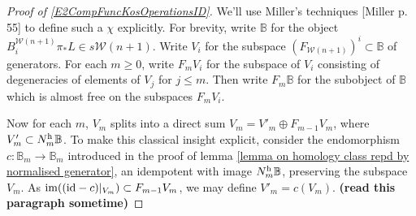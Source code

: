 \documentclass[11pt]{amsart}
\theoremstyle{plain}
\theoremstyle{definition}
\DeclareMathOperator{\im}{im}
\renewcommand{\to}{\longrightarrow}
\newcommand{\calW}{\mathcal{W}}
\theoremstyle{plain}
\newcommand{\Id}{\textup{id}}
\begin{document}
\begin{Composite functor spectral sequences}
\begin{tricky proofs of operation compatibilities}
\begin{proof}[Proof of \ref{E2CompFuncKosOperationsID}]
We'll use Miller's techniques [Miller p. 55] to define such a $\chi$ explicitly. For brevity, write $\mathbb{B}$ for the object $B_i^{\calW(n+1)}\pi_*L\in s\calW(n+1)$. Write $V_i$ for the subspace $(F_{\calW(n+1)})^{i}\subset \mathbb{B}$ of generators. For each $m\geq0$, write $F_mV_i$ for the subspace of $V_i$ consisting of degeneracies of elements of $V_j$ for $j\leq m$. Then write $F_m\mathbb{B}$ for the subobject of $\mathbb{B}$ which is almost free on the subspaces $F_mV_i$.

Now for each $m$, $V_m$ splits into a direct sum
$V_m=V'_m\oplus F_{m-1}V_m$,
where $V'_m\subset N_m^\textup{h}\mathbb{B}$. To make this classical insight explicit, consider the endomorphism $c:\mathbb{B}_m\to \mathbb{B}_m$ introduced in the proof of lemma \ref{lemma on homology class repd by normalised generator}, an idempotent with image $N_m^\textup{h}\mathbb{B}$, preserving the subspace $V_m$. As $\im((\Id-c)|_{V_m})\subset F_{m-1}V_m$, we may define $V'_m=c(V_m)$. \textbf{(read this paragraph sometime)}


\end{proof}
\end{tricky proofs of operation compatibilities}
\end{Composite functor spectral sequences}
\end{document}

